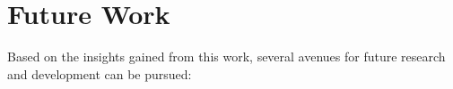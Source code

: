 
\section{Future Work}
Based on the insights gained from this work, several
avenues for future research and development can be
pursued:

